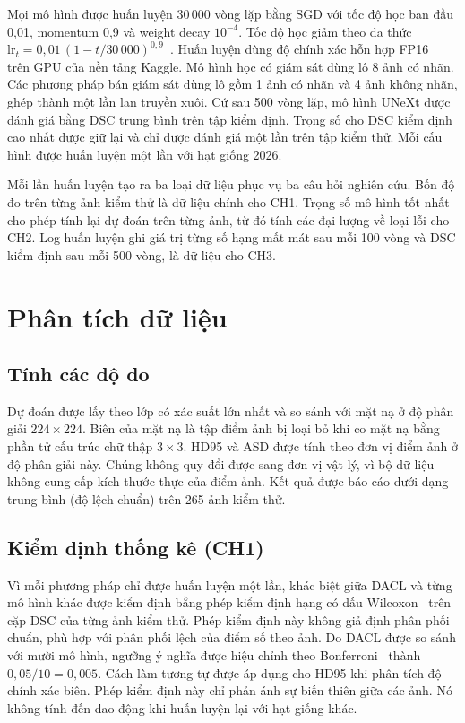 Mọi mô hình được huấn luyện 30\,000 vòng lặp bằng SGD với tốc độ học ban đầu 0,01, momentum 0,9 và weight decay $10^{-4}$. Tốc độ học giảm theo đa thức $\mathrm{lr}_t=0{,}01\,(1-t/30\,000)^{0{,}9}$~\cite{chen2018deeplab}. Huấn luyện dùng độ chính xác hỗn hợp FP16~\cite{micikevicius2018amp} trên GPU của nền tảng Kaggle. Mô hình học có giám sát dùng lô 8 ảnh có nhãn. Các phương pháp bán giám sát dùng lô gồm 1 ảnh có nhãn và 4 ảnh không nhãn, ghép thành một lần lan truyền xuôi. Cứ sau 500 vòng lặp, mô hình UNeXt được đánh giá bằng DSC trung bình trên tập kiểm định. Trọng số cho DSC kiểm định cao nhất được giữ lại và chỉ được đánh giá một lần trên tập kiểm thử. Mỗi cấu hình được huấn luyện một lần với hạt giống 2026.

Mỗi lần huấn luyện tạo ra ba loại dữ liệu phục vụ ba câu hỏi nghiên cứu. Bốn độ đo trên từng ảnh kiểm thử là dữ liệu chính cho CH1. Trọng số mô hình tốt nhất cho phép tính lại dự đoán trên từng ảnh, từ đó tính các đại lượng về loại lỗi cho CH2. Log huấn luyện ghi giá trị từng số hạng mất mát sau mỗi 100 vòng và DSC kiểm định sau mỗi 500 vòng, là dữ liệu cho CH3.

\section{Phân tích dữ liệu}

\subsection{Tính các độ đo}

Dự đoán được lấy theo lớp có xác suất lớn nhất và so sánh với mặt nạ ở độ phân giải $224\times224$. Biên của mặt nạ là tập điểm ảnh bị loại bỏ khi co mặt nạ bằng phần tử cấu trúc chữ thập $3\times3$. HD95 và ASD được tính theo đơn vị điểm ảnh ở độ phân giải này. Chúng không quy đổi được sang đơn vị vật lý, vì bộ dữ liệu không cung cấp kích thước thực của điểm ảnh. Kết quả được báo cáo dưới dạng trung bình (độ lệch chuẩn) trên 265 ảnh kiểm thử.

\subsection{Kiểm định thống kê (CH1)}

Vì mỗi phương pháp chỉ được huấn luyện một lần, khác biệt giữa DACL và từng mô hình khác được kiểm định bằng phép kiểm định hạng có dấu Wilcoxon~\cite{wilcoxon1945} trên cặp DSC của từng ảnh kiểm thử. Phép kiểm định này không giả định phân phối chuẩn, phù hợp với phân phối lệch của điểm số theo ảnh. Do DACL được so sánh với mười mô hình, ngưỡng ý nghĩa được hiệu chỉnh theo Bonferroni~\cite{dunn1961} thành $0{,}05/10=0{,}005$. Cách làm tương tự được áp dụng cho HD95 khi phân tích độ chính xác biên. Phép kiểm định này chỉ phản ánh sự biến thiên giữa các ảnh. Nó không tính đến dao động khi huấn luyện lại với hạt giống khác.

